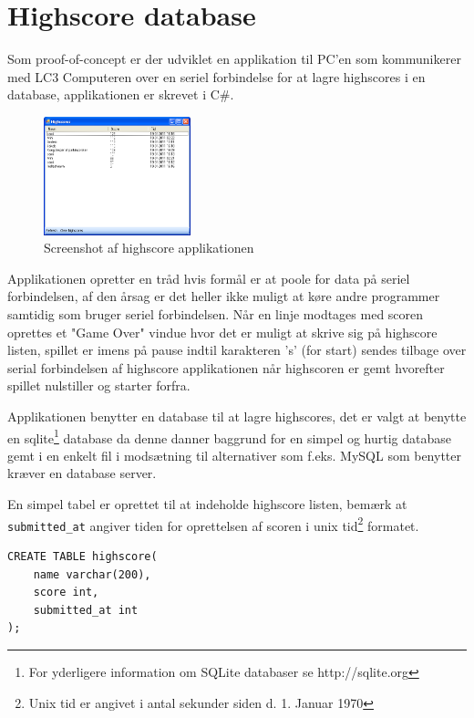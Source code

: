\section{Highscore database}
Som proof-of-concept er der udviklet en applikation til PC'en som kommunikerer med LC3 Computeren over en seriel forbindelse for at lagre highscores i en database, applikationen er skrevet i C\#.

\begin{figure}
  \begin{center}
    \includegraphics[width=0.38\textwidth]{billeder/HighscoreBoard}
  \end{center}
  \caption{Screenshot af highscore applikationen}
\end{figure}

Applikationen opretter en tråd hvis formål er at poole for data på seriel forbindelsen, af den årsag er det heller ikke muligt at køre andre programmer samtidig som bruger seriel forbindelsen. Når en linje modtages med scoren oprettes et "Game Over" vindue hvor det er muligt at skrive sig på highscore listen, spillet er imens på pause indtil karakteren 's' (for start) sendes tilbage over serial forbindelsen af highscore applikationen når highscoren er gemt hvorefter spillet nulstiller og starter forfra.

Applikationen benytter en database til at lagre highscores, det er valgt at benytte en sqlite\footnote{For yderligere information om SQLite databaser se http://sqlite.org} database da denne danner baggrund for en simpel og hurtig database gemt i en enkelt fil i modsætning til alternativer som f.eks. MySQL som benytter kræver en database server.

En simpel tabel er oprettet til at indeholde highscore listen, bemærk at \texttt{submitted\_at} angiver tiden for oprettelsen af scoren i unix tid\footnote{Unix tid er angivet i antal sekunder siden d. 1. Januar 1970} formatet.


\lstset{language=SQL}
\begin{lstlisting}
CREATE TABLE highscore(
	name varchar(200),
	score int,
	submitted_at int
);
\end{lstlisting}